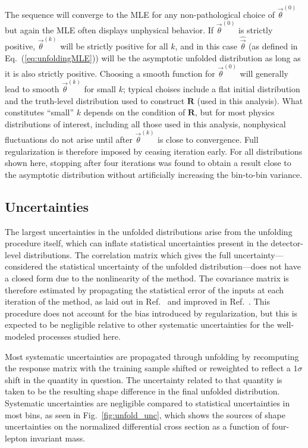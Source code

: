 The sequence will converge to the MLE for any non-pathological choice of $\vec{\theta}^{(0)}$~\cite{vardi1985} but again the MLE often displays unphysical behavior.
If $\vec{\theta}^{(0)}$ is strictly positive, $\vec{\theta}^{(k)}$ will be strictly positive for all $k$, and in this case $\hat{\vec{\theta}}$ (as defined in Eq.~(\ref{eq:unfoldingMLE})) will be the asymptotic unfolded distribution as long as it is also strictly positive.
Choosing a smooth function for $\vec{\theta}^{(0)}$ will generally lead to smooth $\vec{\theta}^{(k)}$ for small $k$; typical choises include a flat initial distribution and the truth-level distribution used to construct $\mathbf{R}$ (used in this analysis).
What constitutes ``small'' $k$ depends on the condition of $\mathbf{R}$, but for most physics distributions of interest, including all those used in this analysis, nonphysical fluctuations do not arise until after $\vec{\theta}^{(k)}$ is close to convergence.
Full regularization is therefore imposed by ceasing iteration early.
For all distributions shown here, stopping after four iterations was found to obtain a result close to the asymptotic distribution without artificially increasing the bin-to-bin variance.

\subsection{Uncertainties}

The largest uncertainties in the unfolded distributions arise from the unfolding procedure itself, which can inflate statistical uncertainties present in the detector-level distributions.
The correlation matrix which gives the full uncertainty---considered the statistical uncertainty of the unfolded distribution---does not have a closed form due to the nonlinearity of the method.
The covariance matrix is therefore estimated by propagating the statistical error of the inputs at each iteration of the method, as laid out in Ref.~\cite{DAgostini:1994fjx} and improved in Ref.~\cite{Adye:2011gm}.
This procedure does not account for the bias introduced by regularization, but this is expected to be negligible relative to other systematic uncertainties for the well-modeled processes studied here.

Most systematic uncertainties are propagated through unfolding by recomputing the response matrix with the training sample shifted or reweighted to reflect a $1\sigma$ shift in the quantity in question.
The uncertainty related to that quantity is taken to be the resulting shape difference in the final unfolded distribution.
Systematic uncertainties are negligible compared to statistical uncertainties in most bins, as seen in Fig.~\ref{fig:unfold_unc}, which shows the sources of shape uncertainties on the normalized differential cross section as a function of four-lepton invariant mass.

